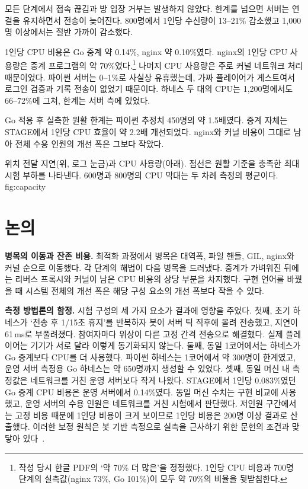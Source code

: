 \documentclass[11pt,a4paper]{article}
\begin{document}
모든 단계에서 접속 끊김과 방 입장 거부는 발생하지 않았다. 한계를 넘으면 서버는 연결을 유지하면서 전송이 늦어진다. 800명에서 1인당 수신량이 13--21\% 감소했고 1,000명 이상에서는 절반 가까이 감소했다.

1인당 CPU 비용은 Go 중계 약 0.14\%, nginx 약 0.10\%였다. nginx의 1인당 CPU 사용량은 중계 프로그램의 약 70\%였다.\footnote{작성 당시 한글 PDF의 ‘약 70\% 더 많은’을 정정했다. 1인당 CPU 비용과 700명 단계의 실측값(nginx 73\%, Go 101\%)이 모두 약 70\%의 비율을 뒷받침한다.} 나머지 CPU 사용량은 주로 커널 네트워크 처리 때문이었다. 파이썬 서버는 0--1\%로 사실상 유휴했는데, 가짜 플레이어가 게스트여서 로그인 검증과 기록 전송이 없었기 때문이다. 하네스 두 대의 CPU는 1,200명에서도 66--72\%에 그쳐, 한계는 서버 측에 있었다.

Go 적용 후 실측한 원활 한계는 파이썬 추정치 450명의 약 1.5배였다. 중계 자체는 STAGE에서 1인당 CPU 효율이 약 2.2배 개선되었다. nginx와 커널 비용이 그대로 남아 전체 수용 인원의 개선 폭은 그보다 작았다.

  {위치 전달 지연(위, 로그 눈금)과 CPU 사용량(아래). 점선은 원활 기준을 충족한 최대 시험 부하를 나타낸다. 600명과 800명의 CPU 막대는 두 차례 측정의 평균이다.}
  {fig:capacity}

\section{논의}
\textbf{병목의 이동과 잔존 비용.}
최적화 과정에서 병목은 대역폭, 파일 핸들, GIL, nginx와 커널 순으로 이동했다. 각 단계의 해법이 다음 병목을 드러냈다. 중계가 가벼워진 뒤에는 리버스 프록시와 커널이 남은 CPU 비용의 상당 부분을 차지했다. 구현 언어를 바꿨을 때 시스템 전체의 개선 폭은 해당 구성 요소의 개선 폭보다 작을 수 있다.

\textbf{측정 방법론의 함정.}
시험 구성의 세 가지 요소가 결과에 영향을 주었다. 첫째, 초기 하네스가 ‘전송 후 1/15초 휴지’를 반복하자 봇이 서버 틱 직후에 몰려 전송했고, 지연이 61\,ms로 부풀려졌다. 참여자마다 위상이 다른 고정 간격 전송으로 해결했다. 실제 플레이어는 기기가 서로 달라 이렇게 동기화되지 않는다. 둘째, 동일 1코어에서는 하네스가 Go 중계보다 CPU를 더 사용했다. 파이썬 하네스는 1코어에서 약 300명이 한계였고, 운영 서버 측정용 Go 하네스는 약 650명까지 생성할 수 있었다. 셋째, 동일 머신 내 측정값은 네트워크를 거친 운영 서버보다 작게 나왔다. STAGE에서 1인당 0.083\%였던 Go 중계 CPU 비용은 운영 서버에서 0.14\%였다. 동일 머신 수치는 구현 비교에 사용했고, 운영 서버의 수용 인원은 네트워크를 거친 시험에서 판단했다. 저인원 구간에서는 고정 비용 때문에 1인당 비용이 크게 보이므로 1인당 비용은 200명 이상 결과로 산출했다. 이러한 보정 원칙은 봇 기반 측정으로 실측을 근사하기 위한 문헌의 조건과 맞닿아 있다~\cite{boulanger_2006_10}.
\end{document}
